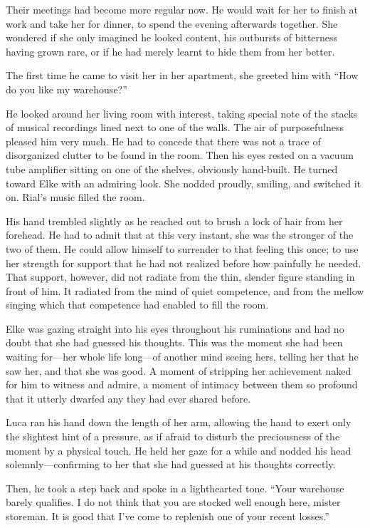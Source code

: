 \firstparagraph

Their meetings had become more regular now. He would wait for her to finish at work and take her for dinner, to spend the evening afterwards together. She wondered if she only imagined he looked content, his outbursts of bitterness having grown rare, or if he had merely learnt to hide them from her better.

The first time he came to visit her in her apartment, she greeted him with ``How do you like my warehouse?''

He looked around her living room with interest, taking special note of the stacks of musical recordings lined next to one of the walls. The air of purposefulness pleased him very much. He had to concede that there was not a trace of disorganized clutter to be found in the room. Then his eyes rested on a vacuum tube amplifier sitting on one of the shelves, obviously hand-built. He turned toward Elke with an admiring look. She nodded proudly, smiling, and switched it on. Rial's music filled the room.

His hand trembled slightly as he reached out to brush a lock of hair from her forehead. He had to admit that at this very instant, she was the stronger of the two of them. He could allow himself to surrender to that feeling this once; to use her strength for support that he had not realized before how painfully he needed. That support, however, did not radiate from the thin, slender figure standing in front of him. It radiated from the mind of quiet competence, and from the mellow singing which that competence had enabled to fill the room.

Elke was gazing straight into his eyes throughout his ruminations and had no doubt that she had guessed his thoughts. This was the moment she had been waiting for---her whole life long---of another mind seeing hers, telling her that he saw her, and that she was good. A moment of stripping her achievement naked for him to witness and admire, a moment of intimacy between them so profound that it utterly dwarfed any they had ever shared before.

Luca ran his hand down the length of her arm, allowing the hand to exert only the slightest hint of a pressure, as if afraid to disturb the preciousness of the moment by a physical touch. He held her gaze for a while and nodded his head solemnly---confirming to her that she had guessed at his thoughts correctly.

Then, he took a step back and spoke in a lighthearted tone. ``Your warehouse barely qualifies. I do not think that you are stocked well enough here, mister storeman. It is good that I've come to replenish one of your recent losses.''

